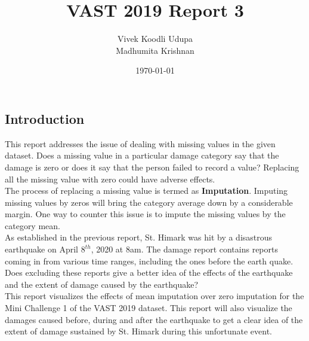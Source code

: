 \documentclass[12pt]{extarticle}
\title{VAST 2019 Report 3}
\author{Vivek Koodli Udupa \\ Madhumita Krishnan}
\date{\today}
\begin{document}
\maketitle

\begin{centering}
	\section{Introduction}
\end{centering}
This report addresses the issue of dealing with missing values in the given dataset. Does a missing value in a particular damage category say that the damage is zero or does it say that the person failed to record a value? Replacing all the missing value with zero could have adverse effects. \\

The process of replacing a missing value is termed as \textbf{Imputation}. Imputing missing values by zeros will bring the category average down by a considerable margin. One way to counter this issue is to impute the missing values by the category mean. \\

As established in the previous report, St. Himark was hit by a disastrous earthquake on April $8^{th}$, 2020 at 8am. The damage report contains reports coming in from various time ranges, including the ones before the earth quake. Does excluding these reports give a better idea of the effects of the earthquake and the extent of damage caused by the earthquake?  \\

This report visualizes the effects of mean imputation over zero imputation for the Mini Challenge 1 of the VAST 2019 dataset. This report will also visualize the damages caused before, during and after the earthquake to get a clear idea of the extent of damage sustained by St. Himark during this unfortunate event. \\





\end{document}
